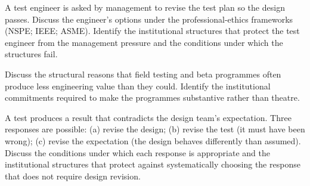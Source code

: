 \begin{exercise}
A test engineer is asked by management to revise the test plan so the design passes. Discuss the engineer's options under the professional-ethics frameworks (NSPE; IEEE; ASME). Identify the institutional structures that protect the test engineer from the management pressure and the conditions under which the structures fail.
\end{exercise}

\begin{exercise}
Discuss the structural reasons that field testing and beta programmes often produce less engineering value than they could. Identify the institutional commitments required to make the programmes substantive rather than theatre.
\end{exercise}

\begin{exercise}
A test produces a result that contradicts the design team's expectation. Three responses are possible: (a) revise the design; (b) revise the test (it must have been wrong); (c) revise the expectation (the design behaves differently than assumed). Discuss the conditions under which each response is appropriate and the institutional structures that protect against systematically choosing the response that does not require design revision.
\end{exercise}
